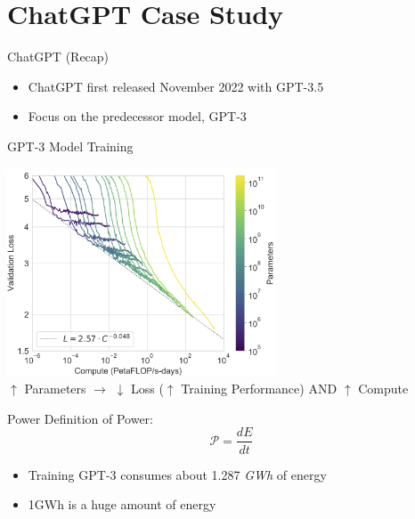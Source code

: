 \section{ChatGPT Case Study}

\begin{frame}{ChatGPT (Recap)}
	\begin{itemize}
		\item ChatGPT first released November 2022 with GPT-3.5 \cite{openai_introducing_2022}
		\item Focus on the predecessor model, GPT-3 \cite{brown_language_2020}
	\end{itemize}
\end{frame}

\begin{frame}{GPT-3 Model Training \cite{brown_language_2020}}
	\begin{center}
		\includegraphics[width=0.6\textwidth]{images/gpt3-training.png} \\
		$\uparrow$ Parameters $\rightarrow$ $\downarrow$ Loss ($\uparrow$ Training Performance) AND $\uparrow$ Compute
	\end{center}
\end{frame}

\begin{frame}{Power}
	Definition of Power:
	\begin{equation*}
		\mathscr{P} = \frac{dE}{dt}
	\end{equation*}
	\begin{itemize}
		\item Training GPT-3 consumes about 1.287 \emph{GWh} of energy \cite{luccioni_estimating_2022}
		\item 1GWh is a huge amount of energy
	\end{itemize}
\end{frame}

